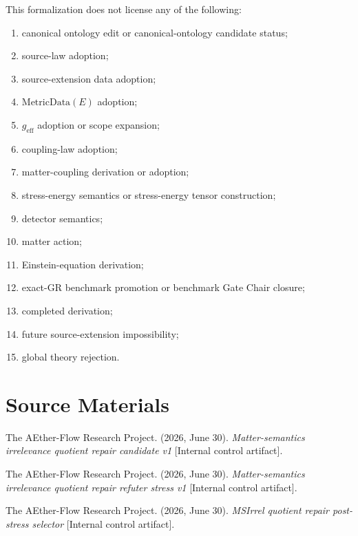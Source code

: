 This formalization does not license any of the following:
\begin{enumerate}
  \item canonical ontology edit or canonical-ontology candidate status;
  \item source-law adoption;
  \item source-extension data adoption;
  \item \(\mathrm{MetricData}(E)\) adoption;
  \item \(g_{\mathrm{eff}}\) adoption or scope expansion;
  \item coupling-law adoption;
  \item matter-coupling derivation or adoption;
  \item stress-energy semantics or stress-energy tensor construction;
  \item detector semantics;
  \item matter action;
  \item Einstein-equation derivation;
  \item exact-GR benchmark promotion or benchmark Gate Chair closure;
  \item completed derivation;
  \item future source-extension impossibility;
  \item global theory rejection.
\end{enumerate}

\section{Source Materials}

The AEther-Flow Research Project. (2026, June 30). \emph{Matter-semantics
irrelevance quotient repair candidate v1} [Internal control artifact].

The AEther-Flow Research Project. (2026, June 30). \emph{Matter-semantics
irrelevance quotient repair refuter stress v1} [Internal control artifact].

The AEther-Flow Research Project. (2026, June 30). \emph{MSIrrel quotient
repair post-stress selector} [Internal control artifact].
